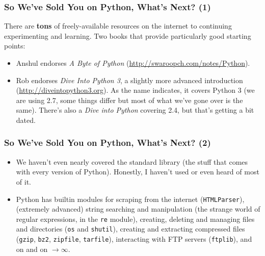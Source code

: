 \documentclass[10pt]{beamer}
\begin{document}
\begin{frame}
  \frametitle{So We've Sold You on Python, What's Next? (1)}
    There are \textbf{tons} of freely-available resources on the internet to continuing experimenting and learning. 
      Two books that provide particularly good starting points:
  \begin{itemize}
    \item Anshul endorses \emph{A Byte of Python} (\href{http://swaroopch.com/notes/Python}{http://swaroopch.com/notes/Python}).
    \item Rob endorses \emph{Dive Into Python 3}, a slightly more advanced introduction (\href{http://diveintopython3.org}{http://diveintopython3.org}).  As the name indicates, it covers Python 3 (we are using 2.7, some things differ but most of what we've gone over is the same).
    There's also a \emph{Dive into Python}   covering 2.4, but that's getting a bit dated.
  \end{itemize}
\end{frame}

\begin{frame}
  \frametitle{So We've Sold You on Python, What's Next? (2)}
  \begin{itemize}
    \item We haven't even nearly covered the standard library (the stuff that comes with every version of Python). 
      Honestly, I haven't used or even heard of most of it.
    \item Python has builtin modules for scraping from the internet (\texttt{HTMLParser}), (extremely advanced) string searching and manipulation (the strange world of regular expressions, in the \texttt{re} module), creating, deleting and managing files and directories (\texttt{os} and \texttt{shutil}), creating and extracting compressed files (\texttt{gzip}, \texttt{bz2}, \texttt{zipfile}, \texttt{tarfile}), interacting with FTP servers (\texttt{ftplib}), and on and on $\rightarrow \infty$.
  \end{itemize}
\end{frame}
\end{document}
